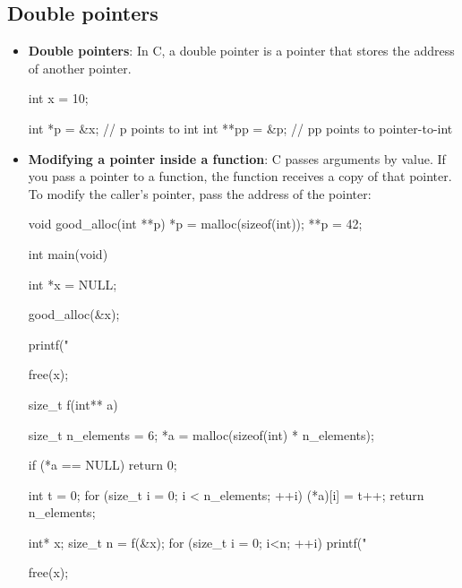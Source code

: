 \documentclass{report}
\begin{document}
        \subsection{Double pointers}
        \begin{itemize}
            \item \textbf{Double pointers}: In C, a double pointer is a pointer that stores the address of another pointer.
                \bigbreak \noindent 
                \begin{cppcode}
                int x = 10;

                int *p = &x;    // p points to int
                int **pp = &p;  // pp points to pointer-to-int
                \end{cppcode}
            \item \textbf{Modifying a pointer inside a function}: C passes arguments by value. If you pass a pointer to a function, the function receives a copy of that pointer.
                \bigbreak \noindent 
                To modify the caller’s pointer, pass the address of the pointer:
                \bigbreak \noindent 
                \begin{cppcode}
                    void good_alloc(int **p) {
                        *p = malloc(sizeof(int));
                        **p = 42;
                    }

                    int main(void) {
                        int *x = NULL;

                        good_alloc(&x);

                        printf("%

                        free(x);
                    }
                \end{cppcode}

                \bigbreak \noindent 
                \begin{cppcode}
                    size_t f(int** a) {
                        size_t n_elements = 6;
                        *a = malloc(sizeof(int) * n_elements); 

                        if (*a == NULL) return 0;

                        int t = 0;
                        for (size_t i = 0; i < n_elements; ++i) {
                            (*a)[i] = t++;
                        }
                        return n_elements;
                    }

                    int* x;
                    size_t n = f(&x);
                    for (size_t i = 0; i<n; ++i) {
                        printf("%
                    }

                    free(x);
                \end{cppcode}

        \end{itemize}
\end{document}
